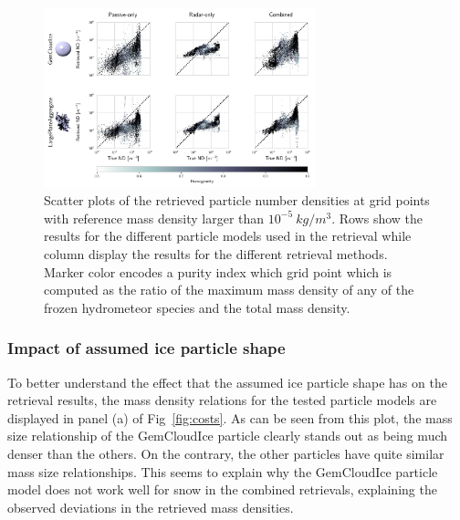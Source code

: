 \documentclass[journal abbreviation, manuscript]{copernicus}
\begin{document}
\begin{figure}
\centering
\includegraphics[width = 0.7\textwidth]{../plots/results_nd_scatter_a}
\caption{Scatter plots of the retrieved particle number densities at grid points with
  reference mass density larger than $10^{-5}\ \unit{kg/m^3}$. Rows show the results
  for the different particle models used in the retrieval while column display the
  results for the different retrieval methods. Marker color encodes a purity index 
  which grid point which is computed as the ratio of the maximum mass density of
  any of the frozen hydrometeor species and the total mass density.}
\label{fig:results_nd_scatter_a}
\end{figure}

\subsubsection{Impact of assumed ice particle shape}

To better understand the effect that the assumed ice particle shape has on the
retrieval results, the mass density relations for the tested particle models are
displayed in panel (a) of Fig~\ref{fig:costs}. As can be seen from this plot,
the mass size relationship of the GemCloudIce particle clearly stands out as
being much denser than the others. On the contrary, the other particles have
quite similar mass size relationships. This seems to explain why the GemCloudIce
particle model does not work well for snow in the combined retrievals,
explaining the observed deviations in the retrieved mass densities.
\end{document}
